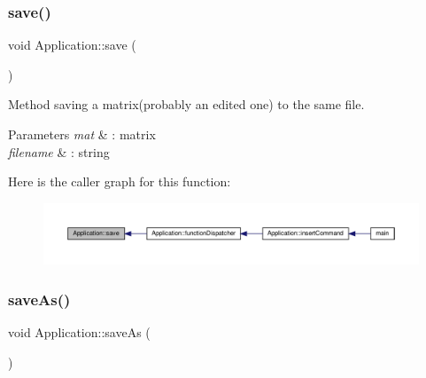\subsubsection{\texorpdfstring{save()}{save()}}
{\footnotesize\ttfamily void Application\+::save (\begin{DoxyParamCaption}{ }\end{DoxyParamCaption})\hspace{0.3cm}{\ttfamily [private]}}

Method saving a matrix(probably an edited one) to the same file. 
\begin{DoxyParams}{Parameters}
{\em mat} & \+: matrix \\
\hline
{\em filename} & \+: string \\
\hline
\end{DoxyParams}
Here is the caller graph for this function\+:
\nopagebreak
\begin{figure}[H]
\begin{center}
\leavevmode
\includegraphics[width=350pt]{class_application_a2cbf94e01d55a814de35f90f4d874647_icgraph}
\end{center}
\end{figure}
\mbox{\label{class_application_a10d5a48c95593cee25c1b9e0e257b5a7}} 
\subsubsection{\texorpdfstring{save\+As()}{saveAs()}}
{\footnotesize\ttfamily void Application\+::save\+As (\begin{DoxyParamCaption}{ }\end{DoxyParamCaption})\hspace{0.3cm}{\ttfamily [private]}}


